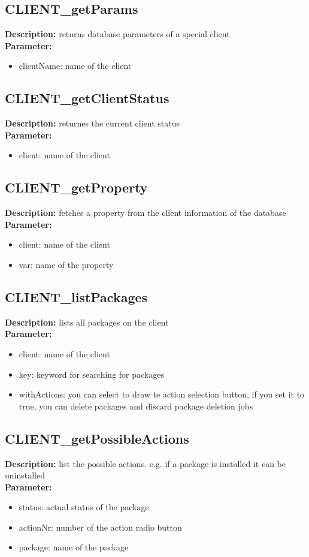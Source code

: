 \subsection{CLIENT\_getParams}
\textbf{Description:} returns database parameters of a special client\\
\textbf{Parameter:}
\begin{itemize}
\item clientName: name of the client
\end{itemize}

\subsection{CLIENT\_getClientStatus}
\textbf{Description:} returnes the current client status\\
\textbf{Parameter:}
\begin{itemize}
\item client: name of the client
\end{itemize}

\subsection{CLIENT\_getProperty}
\textbf{Description:} fetches a property from the client information of the database\\
\textbf{Parameter:}
\begin{itemize}
\item client: name of the client
\item var: name of the property
\end{itemize}

\subsection{CLIENT\_listPackages}
\textbf{Description:} lists all packages on the client\\
\textbf{Parameter:}
\begin{itemize}
\item client: name of the client
\item key: keyword for searching for packages
\item withActions: you can select to draw te action selection button, if you set it to true, you can delete packages and discard package deletion jobs
\end{itemize}

\subsection{CLIENT\_getPossibleActions}
\textbf{Description:} list the possible actions. e.g. if a package is installed it can be uninstalled\\
\textbf{Parameter:}
\begin{itemize}
\item status: actual status of the package
\item actionNr: number of the action radio button
\item package: name of the package
\end{itemize}

